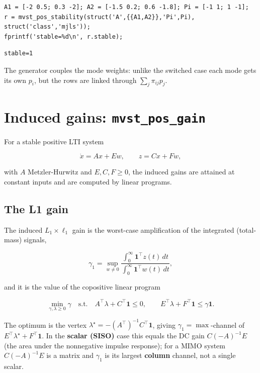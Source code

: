 \documentclass[11pt,oneside]{report}
\newcommand{\code}[1]{\texttt{#1}}
\begin{document}
\begin{lstlisting}[style=matlabstyle]
A1 = [-2 0.5; 0.3 -2]; A2 = [-1.5 0.2; 0.6 -1.8]; Pi = [-1 1; 1 -1];
r = mvst_pos_stability(struct('A',{{A1,A2}},'Pi',Pi), struct('class','mjls'));
fprintf('stable=%d\n', r.stable);
\end{lstlisting}

\begin{lstlisting}[style=outputstyle]
stable=1
\end{lstlisting}

The generator couples the mode weights: unlike the switched case each mode gets
its own \(p_i\), but the rows are linked through \(\sum_j \pi_{ij} p_j\).

\hypertarget{induced-gains-mvst_pos_gain}{%
\section{\texorpdfstring{Induced gains: \code{mvst\_pos\_gain}}{Induced gains: mvst\_pos\_gain}}\label{induced-gains-mvst_pos_gain}}

For a stable positive LTI system

\[
\dot x = A x + E w, \qquad z = C x + F w,
\]

with \(A\) Metzler-Hurwitz and \(E, C, F \ge 0\), the induced gains are attained at
constant inputs and are computed by linear programs.

\hypertarget{the-l1-gain}{%
\subsection{The L1 gain}\label{the-l1-gain}}

The induced \(L_1 \times \ell_1\) gain is the worst-case amplification of the
integrated (total-mass) signals,

\[
\gamma_1
= \sup_{w \ne 0}
\frac{\displaystyle\int_0^\infty \mathbf{1}^\top z(t)\,dt}
     {\displaystyle\int_0^\infty \mathbf{1}^\top w(t)\,dt},
\]

and it is the value of the copositive linear program

\[
\min_{\gamma, \lambda \ge 0} \gamma
\quad\text{s.t.}\quad
A^\top \lambda + C^\top \mathbf{1} \le 0,
\qquad
E^\top \lambda + F^\top \mathbf{1} \le \gamma \mathbf{1} .
\]

The optimum is the vertex \(\lambda^\star = -(A^\top)^{-1} C^\top \mathbf{1}\),
giving \(\gamma_1 = \max\)-channel of \(E^\top \lambda^\star + F^\top \mathbf{1}\).
In the \textbf{scalar (SISO)} case this equals the DC gain \(C(-A)^{-1} E\) (the area
under the nonnegative impulse response); for a MIMO system \(C(-A)^{-1}E\) is a
matrix and \(\gamma_1\) is its largest \textbf{column} channel, not a single scalar.
\end{document}
